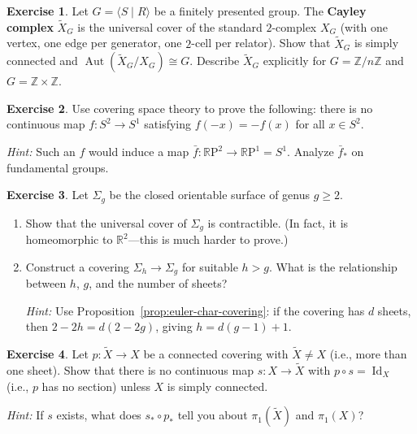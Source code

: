 \documentclass[12pt,a4paper,openany]{book}
\theoremstyle{definition}
\newtheorem{exercise}{Exercise}[chapter]
\theoremstyle{plain}
\theoremstyle{remark}
\newcommand{\Z}{\mathbb{Z}}
\newcommand{\R}{\mathbb{R}}
\newcommand{\RP}{\mathbb{R}\mathrm{P}}
\DeclareMathOperator{\Aut}{Aut}
\DeclareMathOperator{\Id}{Id}
\begin{document}
\begin{exercise}\label{exo:cov-cayley-complex}
  Let $G = \langle S \mid R \rangle$ be a finitely presented group.  The
  \textbf{Cayley complex} $\widetilde{X}_G$ is the universal cover of the
  standard $2$-complex $X_G$ (with one vertex, one edge per generator, one
  $2$-cell per relator).  Show that $\widetilde{X}_G$ is simply connected and
  $\Aut(\widetilde{X}_G / X_G) \cong G$.  Describe $\widetilde{X}_G$
  explicitly for $G = \Z/n\Z$ and $G = \Z \times \Z$.
\end{exercise}

\begin{exercise}\label{exo:cov-borsuk-ulam}
  Use covering space theory to prove the following:
  there is no continuous map $f\colon S^2 \to S^1$ satisfying
  $f(-x) = -f(x)$ for all $x \in S^2$.

  \textit{Hint:} Such an $f$ would induce a map $\bar{f}\colon \RP^2 \to
  \RP^1 = S^1$.  Analyze $\bar{f}_*$ on fundamental groups.
\end{exercise}

\begin{exercise}\label{exo:cov-surface-cover}
  Let $\Sigma_g$ be the closed orientable surface of genus $g \geq 2$.
  \begin{enumerate}[label=(\alph*)]
    \item Show that the universal cover of $\Sigma_g$ is contractible.
      (In fact, it is homeomorphic to $\R^2$---this is much harder to
      prove.)
    \item Construct a covering $\Sigma_h \to \Sigma_g$ for suitable $h > g$.
      What is the relationship between $h$, $g$, and the number of sheets?

      \textit{Hint:} Use Proposition~\ref{prop:euler-char-covering}: if the
      covering has $d$ sheets, then
      $2 - 2h = d(2 - 2g)$, giving $h = d(g-1) + 1$.
  \end{enumerate}
\end{exercise}

\begin{exercise}\label{exo:cov-no-retraction}
  Let $p\colon \widetilde{X} \to X$ be a connected covering with
  $\widetilde{X} \neq X$ (i.e., more than one sheet).  Show that there
  is no continuous map $s\colon X \to \widetilde{X}$ with $p \circ s = \Id_X$
  (i.e., $p$ has no section) unless $X$ is simply connected.

  \textit{Hint:} If $s$ exists, what does $s_* \circ p_*$ tell you about
  $\pi_1(\widetilde{X})$ and $\pi_1(X)$?
\end{exercise}
\end{document}
